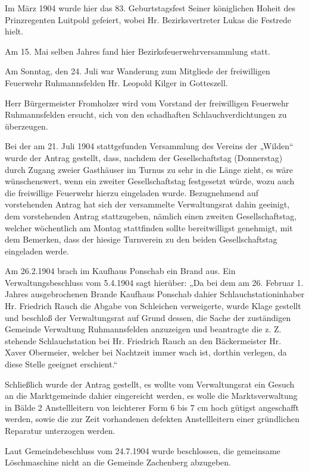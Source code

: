 \documentclass[12pt,a4pager]{book}
\begin{document}
Im März 1904 wurde hier das 83. Geburtstagsfest Seiner königlichen Hoheit des
Prinzregenten Luitpold gefeiert, wobei Hr. Bezirksvertreter Lukas die Festrede
hielt.

Am 15. Mai selben Jahres fand hier Bezirksfeuerwehrversammlung statt.

Am Sonntag, den 24. Juli war Wanderung zum Mitgliede der freiwilligen Feuerwehr
Ruhmannsfelden Hr. Leopold Kilger in Gotteszell.

Herr Bürgermeister Fromholzer wird vom Vorstand der freiwilligen Feuerwehr
Ruhmannsfelden ersucht, sich von den schadhaften Schlauchverdichtungen zu
überzeugen.

Bei der am 21. Juli 1904 stattgefunden Versammlung des Vereins der „Wilden“
wurde der Antrag gestellt, dass, nachdem der Gesellschaftstag (Donnerstag) durch
Zugang zweier Gasthäuser im Turnus zu sehr in die Länge zieht, es wäre
wünschenswert, wenn ein zweiter Gesellschaftstag festgesetzt würde, wozu auch
die freiwillige Feuerwehr hierzu eingeladen wurde. Bezugnehmend auf vorstehenden
Antrag hat sich der versammelte Verwaltungsrat dahin geeinigt, dem vorstehenden
Antrag stattzugeben, nämlich einen zweiten Gesellschaftstag, welcher wöchentlich
am Montag stattfinden sollte bereitwilligst genehmigt, mit dem Bemerken, dass
der hiesige Turnverein zu den beiden Gesellschaftstag eingeladen werde.

Am 26.2.1904 brach im Kaufhaus Ponschab ein Brand aus. Ein Verwaltungsbeschluss
vom 5.4.1904 sagt hierüber: „Da bei dem am 26. Februar 1. Jahres ausgebrochenen
Brande Kaufhaus Ponschab dahier Schlauchstationinhaber Hr. Friedrich Rauch die
Abgabe von Schleichen verweigerte, wurde Klage gestellt und beschloß der
Verwaltungsrat auf Grund dessen, die Sache der zuständigen Gemeinde Verwaltung
Ruhmannsfelden anzuzeigen und beantragte die z. Z. stehende Schlauchstation bei
Hr. Friedrich Rauch an den Bäckermeister Hr. Xaver Obermeier, welcher bei
Nachtzeit immer wach ist, dorthin verlegen, da diese Stelle geeignet erschient.“

Schließlich wurde der Antrag gestellt, es wollte vom Verwaltungsrat ein Gesuch
an die Marktgemeinde dahier eingereicht werden, es wolle die Marktsverwaltung in
Bälde 2 Anstellleitern von leichterer Form 6 bis 7 cm hoch gütigst angeschafft
werden, sowie die zur Zeit vorhandenen defekten Anstellleitern einer gründlichen
Reparatur unterzogen werden.

Laut Gemeindebeschluss vom 24.7.1904 wurde beschlossen, die gemeinsame
Löschmaschine nicht an die Gemeinde Zachenberg abzugeben.
\end{document}
